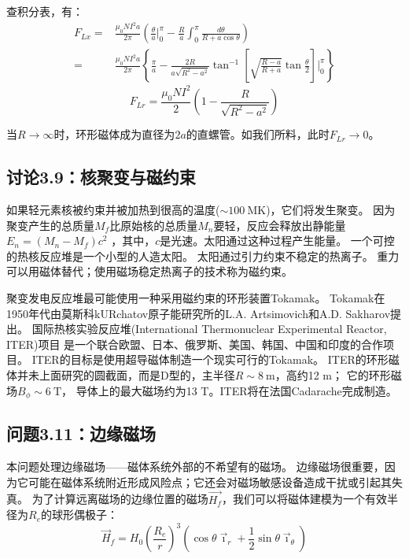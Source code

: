 查积分表，有：
\begin{equation*}
\begin{split}
F_{Lx}=&\frac{\mu_{0}NI^{2}a}{2\pi}(\frac{\theta}{a}\big|_{0}^{\pi}-\frac{R}{a}\int_{0}^{\pi}\frac{d\theta}{R+a\cos\theta})\\
=&\frac{\mu_{0}NI^{2}a}{2\pi}\left\{\frac{\pi}{a}-\frac{2R}{a\sqrt{R^{2}-a^{2}}}\tan^{-1}\left[\sqrt{\frac{R-a}{R+a}}\tan\frac{\theta}{2}\right]\big|_{0}^{\pi}\right\}%
\end{split}\tag{S10.7a}
\end{equation*}
\begin{equation*}
F_{Lr}=\frac{\mu_{0}NI^{2}}{2}(1-\frac{R}{\sqrt{R^{2}-a^{2}}})\tag{3.162}%
\end{equation*}

当$R\rightarrow \infty$时，环形磁体成为直径为$2a$的直螺管。如我们所料，此时$F_{Lr}\rightarrow 0$。



\subsection{讨论3.9：核聚变与磁约束}
如果轻元素核被约束并被加热到很高的温度($\sim 100\ \mathrm{MK}$)，它们将发生聚变。
因为聚变产生的总质量$M_f$比原始核的总质量$M_n$要轻，反应会释放出静能量$E_n =(M_n−M_f)c^2$
，其中，$c$是光速。太阳通过这种过程产生能量。
一个可控的热核反应堆是一个小型的人造太阳。
太阳通过引力约束不稳定的热离子。
重力可以用磁体替代；使用磁场稳定热离子的技术称为磁约束。

聚变发电反应堆最可能使用一种采用磁约束的环形装置Tokamak。
Tokamak在1950年代由莫斯科kURchatov原子能研究所的L.A. Artsimovich和A.D. Sakharov提出。
国际热核实验反应堆(International Thermonuclear Experimental Reactor, ITER)项目
是一个联合欧盟、日本、俄罗斯、美国、韩国、中国和印度的合作项目。
ITER的目标是使用超导磁体制造一个现实可行的Tokamak。
ITER的环形磁体并未上面研究的圆截面，而是D型的，主半径$R\sim 8\ \mathrm{m}$，高约12 m；
它的环形磁场$B_\phi\sim 6\ \mathrm{T}$，
导体上的最大磁场约为13 T。ITER将在法国Cadarache完成制造。



\subsection{问题3.11：边缘磁场}
本问题处理边缘磁场——磁体系统外部的不希望有的磁场。
边缘磁场很重要，因为它可能在磁体系统附近形成风险点；它还会对磁场敏感设备造成干扰或引起其失真。
为了计算远离磁场的边缘位置的磁场$\vec{H_f}$，我们可以将磁体建模为一个有效半径为$R_e$的球形偶极子：
\begin{equation}
\vec{H}_{f}=H_{0}(\frac{R_{e}}{r})^{3}(\cos\theta\vec{\imath}_{r}+\frac{1}{2}\sin\theta\vec{\imath}_{\theta})
\end{equation}

